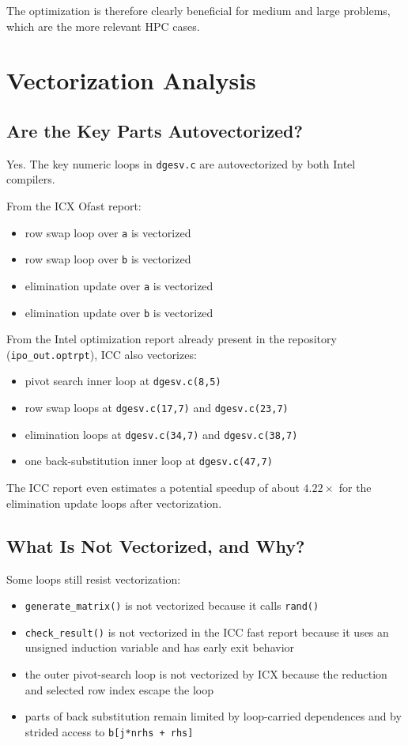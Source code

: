 \documentclass[11pt,a4paper]{article}
\begin{document}
The optimization is therefore clearly beneficial for medium and large problems,
which are the more relevant HPC cases.

\section{Vectorization Analysis}

\subsection{Are the Key Parts Autovectorized?}

Yes. The key numeric loops in \texttt{dgesv.c} are autovectorized by both Intel
compilers.

From the ICX Ofast report:

\begin{itemize}
\item row swap loop over \texttt{a} is vectorized
\item row swap loop over \texttt{b} is vectorized
\item elimination update over \texttt{a} is vectorized
\item elimination update over \texttt{b} is vectorized
\end{itemize}

From the Intel optimization report already present in the repository
(\texttt{ipo\_out.optrpt}), ICC also vectorizes:

\begin{itemize}
\item pivot search inner loop at \texttt{dgesv.c(8,5)}
\item row swap loops at \texttt{dgesv.c(17,7)} and \texttt{dgesv.c(23,7)}
\item elimination loops at \texttt{dgesv.c(34,7)} and \texttt{dgesv.c(38,7)}
\item one back-substitution inner loop at \texttt{dgesv.c(47,7)}
\end{itemize}

The ICC report even estimates a potential speedup of about $4.22\times$ for
the elimination update loops after vectorization.

\subsection{What Is Not Vectorized, and Why?}

Some loops still resist vectorization:

\begin{itemize}
\item \texttt{generate\_matrix()} is not vectorized because it calls \texttt{rand()}
\item \texttt{check\_result()} is not vectorized in the ICC fast report because it uses an unsigned induction variable and has early exit behavior
\item the outer pivot-search loop is not vectorized by ICX because the reduction and selected row index escape the loop
\item parts of back substitution remain limited by loop-carried dependences and by strided access to \texttt{b[j*nrhs + rhs]}
\end{itemize}
\end{document}
